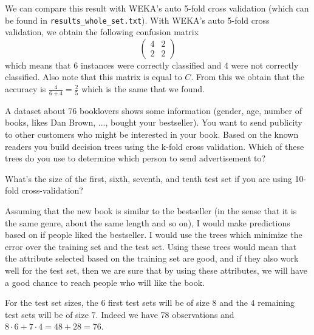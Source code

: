 \documentclass[fontsize=12pt, usenames, dvipsnames, headinclude, headsepline, footinclude, footsepline]{scrartcl}
\begin{document}
\begin{sol}
    We can compare this result with WEKA's auto 5-fold cross validation (which can be found in
    \texttt{results\_whole\_set.txt}). With WEKA's auto 5-fold cross validation, we obtain the following
    confusion matrix 
    \[
      \begin{pmatrix}
        4 & 2 \\
        2 & 2
      \end{pmatrix}
    \]
    which means that 6 instances were correctly classified and 4 were not correctly classified. Also note that
    this matrix is equal to $C$. From this we obtain that the accuracy is $\frac{4}{6+4} = \frac{2}{5}$ which
    is the same that we found. 
  \end{sol}


\begin{exo}
  A dataset about 76 booklovers shows some information (gender, age, number of books, likes Dan Brown, ...,
  bought your bestseller). You want to send publicity to other customers who might be interested in your
  book. Based on the known readers you build decision trees using the k-fold cross validation. Which of these
  trees do you use to determine which person to send advertisement to?  

  What’s the size of the first, sixth, seventh, and tenth test set if you are using 10-fold cross-validation?
\end{exo}

  \begin{sol}
    Assuming that the new book is similar to the bestseller (in the sense that it is the same genre, about the
    same length and so on), I would make predictions based on if people liked the bestseller. I would use the
    trees which minimize the error over the training set and the test set. Using these trees would mean that
    the attribute selected based on the training set are good, and if they also work well for the test set,
    then we are sure that by using these attributes, we will have a good chance to reach people who will like
    the book.

    For the test set sizes, the $6$ first test sets will be of size $8$ and the $4$ remaining test sets will
    be of size $7$. Indeed we have 78 observations and $8\cdot 6 + 7\cdot 4 = 48 + 28 = 76$.
  \end{sol}



	
\end{document}
